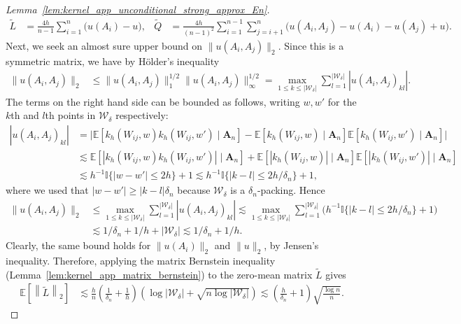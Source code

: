 \documentclass[11pt,lof]{puthesis}
\newcommand{\E}{\ensuremath{\mathbb{E}}}
\newcommand{\I}{\ensuremath{\mathbb{I}}}
\newcommand{\bA}{\ensuremath{\mathbf{A}}}
\newcommand{\cW}{\ensuremath{\mathcal{W}}}
\theoremstyle{break}
\theoremstyle{proof}
\newtheorem{proof}{Proof}
\begin{document}
\begin{proof}[Lemma~\ref{lem:kernel_app_unconditional_strong_approx_En}]
%
\begin{align*}
\tilde L
&=
\frac{4h}{n-1}
\sum_{i=1}^n
\big(
u(A_i) - u
\big),
&\tilde Q
&=
\frac{4h}{(n-1)^2}
\sum_{i=1}^{n-1}
\sum_{j=i+1}^{n}
\big(
u(A_i, A_j) - u(A_i) - u(A_j) + u
\big).
\end{align*}
%
Next, we seek an almost sure upper bound on
$\|u(A_i, A_j)\|_2$.
Since this is a symmetric matrix,
we have by H{\"o}lder's inequality
%
\begin{align*}
\|u(A_i, A_j)\|_2
&\leq
\|u(A_i, A_j)\|_1^{1/2}
\|u(A_i, A_j)\|_\infty^{1/2}
=
\max_{1 \leq k \leq |\cW_\delta|}
\sum_{l=1}^{|\cW_\delta|}
|u(A_i, A_j)_{kl}|.
\end{align*}
%
The terms on the right hand side can be bounded as follows,
writing $w, w'$ for the $k$th and $l$th
points in $\cW_\delta$ respectively:
%
\begin{align*}
|u(A_i, A_j)_{kl}|
&=
\big|
\E\left[
k_h(W_{i j}, w)
k_h(W_{i j}, w')
\mid \bA_n
\right]
-
\E\left[
k_h(W_{i j}, w)
\mid \bA_n
\right]
\E\left[
k_h(W_{i j}, w')
\mid \bA_n
\right]
\big| \\
&\lesssim
\E\left[
|
k_h(W_{i j}, w)
k_h(W_{i j}, w')
|
\mid \bA_n
\right]
+
\E\left[
|
k_h(W_{i j}, w)
|
\mid \bA_n
\right]
\E\left[
|
k_h(W_{i j}, w')
|
\mid \bA_n
\right] \\
&\lesssim
h^{-1}
\I\big\{ |w-w'| \leq 2h \big\}
+ 1
\lesssim
h^{-1}
\I\big\{ |k-l| \leq 2h/\delta_n \big\}
+ 1,
\end{align*}
%
where we used that
$|w-w'| \geq |k-l| \delta_n$
because $\cW_\delta$
is a $\delta_n$-packing.
Hence
%
\begin{align*}
\|u(A_i, A_j)\|_2
&\leq
\max_{1 \leq k \leq |\cW_\delta|}
\sum_{l=1}^{|\cW_\delta|}
|u(A_i, A_j)_{kl}|
\lesssim
\max_{1 \leq k \leq |\cW_\delta|}
\sum_{l=1}^{|\cW_\delta|}
\Big(
h^{-1}
\I\big\{ |k-l| \leq 2h/\delta_n \big\}
+ 1
\Big) \\
&\lesssim
1/\delta_n
+ 1/h
+ |\cW_\delta|
\lesssim
1/\delta_n
+ 1/h.
\end{align*}
%
Clearly, the same bound holds for
$\|u(A_i)\|_2$ and $\|u\|_2$, by Jensen's inequality.
Therefore, applying the matrix Bernstein inequality
(Lemma~\ref{lem:kernel_app_matrix_bernstein})
to the zero-mean matrix $\tilde L$ gives
%
\begin{align*}
\E\left[
\left\|
\tilde L
\right\|_2
\right]
&\lesssim
\frac{h}{n}
\left(\frac{1}{\delta_n} + \frac{1}{h} \right)
\left(
\log |\cW_\delta| + \sqrt{n \log |\cW_\delta|}
\right)
\lesssim
\left(\frac{h}{\delta_n} + 1 \right)
\sqrt{\frac{\log n}{n}}.
\end{align*}

\end{proof}
\end{document}
